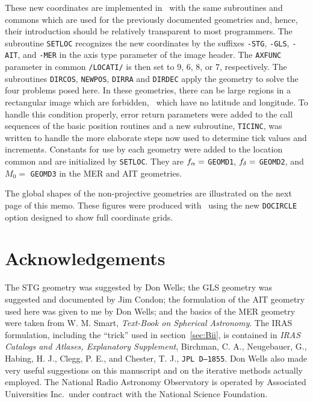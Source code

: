      These new coordinates are implemented in \AIPS\ with the same
subroutines and commons which are used for the previously documented
geometries and, hence, their introduction should be relatively
transparent to most programmers.  The subroutine {\tt SETLOC}
recognizes the new coordinates by the suffixes {\tt -STG}, {\tt -GLS},
{\tt -AIT}, and {\tt -MER} in the axis type parameter of the image
header.  The {\tt AXFUNC} parameter in common {\tt /LOCATI/} is then
set to 9, 6, 8, or 7, respectively.  The subroutines {\tt DIRCOS},
{\tt NEWPOS}, {\tt DIRRA} and {\tt DIRDEC} apply the geometry to solve
the four problems posed here.  In these geometries, there can be large
regions in a rectangular image which are forbidden, \ie\ which have no
latitude and longitude.  To handle this condition properly, error
return parameters were added to the call sequences of the basic
position routines and a new subroutine, {\tt TICINC}, was written to
handle the more elaborate steps now used to determine tick values and
increments.  Constants for use by each geometry were added to the
location common and are initialized by {\tt SETLOC}.  They are $f_{\alpha} =$
{\tt GEOMD1}, $f_{\delta} =$ {\tt GEOMD2}, and $M_0 =$ {\tt GEOMD3} in the
MER and AIT geometries.

     The global shapes of the non-projective geometries are
illustrated on the next page of this memo.  These figures were
produced with \AIPS\ using the new {\tt DOCIRCLE} option designed to
show full coordinate grids.

\section{Acknowledgements}

     The STG geometry was suggested by Don Wells; the GLS geometry was
suggested and documented by Jim Condon; the formulation of the AIT
geometry used here was given to me by Don Wells; and the basics of the
MER geometry were taken from W. M. Smart, {\it Text-Book on Spherical
Astronomy}.  The IRAS formulation, including the ``trick'' used in
section~\ref{sec:Bii}, is contained in {\it IRAS Catalogs and Atlases,
Explanatory Supplement}, Birchman, C. A., Neugebauer, G., Habing, H.
J., Clegg, P. E., and Chester, T. J., {\tt JPL D--1855}.  Don Wells
also made very useful suggestions on this manuscript and on the
iterative methods actually employed.  The National Radio Astronomy
Observatory is operated by Associated Universities Inc.~under contract
with the National Science Foundation.

\vfill\eject

\begin{figure}
\centerline{}
\end{figure}
\vfill
\begin{figure}
\centerline{}
\end{figure}


